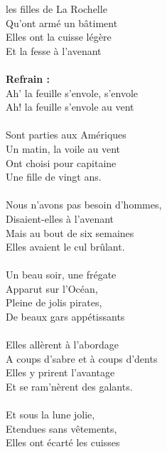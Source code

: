 
 les filles de La Rochelle
\\Qu'ont armé un bâtiment ~~\bissimple
\\Elles ont la cuisse légère
\\Et la fesse à l'avenant
\\\\\textbf{Refrain :}
\\Ah' la feuille s'envole, s'envole
\\Ah! la feuille s'envole au vent
\\\\Sont parties aux Amériques
\\Un matin, la voile au vent~~ \bissimple
\\Ont choisi pour capitaine
\\Une fille de vingt ans.
\\\\Nous n'avons pas besoin d'hommes,
\\Disaient-elles à l'avenant ~~~~~~~~~~~~\bissimple
\\Mais au bout de six semaines
\\Elles avaient le cul brûlant.
\\\\Un beau soir, une frégate
\\Apparut sur l'Océan,~~~~~~ \bissimple
\\Pleine de jolis pirates,
\\De beaux gars appétissants
\\\\Elles allèrent à l'abordage
\\A coups d'sabre et à coups d'dents~ \bissimple
\\Elles y prirent l'avantage
\\Et se ram'nèrent des galants.
\\\\Et sous la lune jolie,
\\Etendues sans vêtements,~~~~~ \bissimple
\\Elles ont écarté les cuisses
